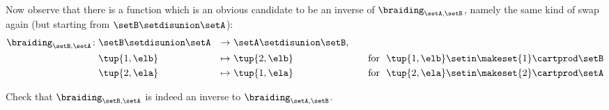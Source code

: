 Now observe that there is a function which is an obvious candidate to be an inverse of $\braiding_{\setA, \setB}$, namely the same kind of swap again (but starting from $\setB \setdisunion \setA$): 
\begin{equation}\label{eq:braiding-sum-sets-inverse}
\begin{aligned}
        \braiding_{\setB, \setA} \colon & \setB \setdisunion \setA & \to & \ \setA \setdisunion \setB, & \ \\
        & \tup{1, \elb} & \mapsto &\  \tup{2, \elb} & \ \text{ for } \ \tup{1, \elb} \setin \makeset{1} \cartprod \setB
         \\
        & \tup{2, \ela} & \mapsto &\  \tup{1, \ela} & \ \ \text{ for } \ \tup{2, \ela} \setin \makeset{2} \cartprod \setA \\
\end{aligned}
\end{equation}
\begin{exercise}
Check that $\braiding_{\setB, \setA}$ is indeed an inverse to $\braiding_{\setA, \setB}$.
\end{exercise}

